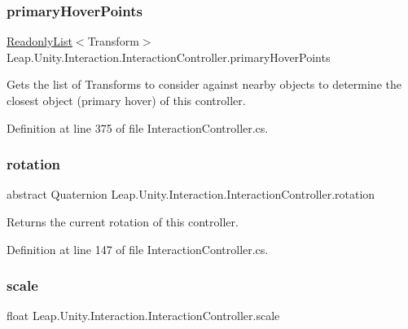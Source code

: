 \subsubsection{\texorpdfstring{primaryHoverPoints}{primaryHoverPoints}}
{\footnotesize\ttfamily \mbox{\hyperlink{struct_leap_1_1_unity_1_1_readonly_list}{Readonly\+List}}$<$Transform$>$ Leap.\+Unity.\+Interaction.\+Interaction\+Controller.\+primary\+Hover\+Points\hspace{0.3cm}{\ttfamily [get]}}



Gets the list of Transforms to consider against nearby objects to determine the closest object (primary hover) of this controller. 



Definition at line 375 of file Interaction\+Controller.\+cs.

\mbox{\label{class_leap_1_1_unity_1_1_interaction_1_1_interaction_controller_a783f8f2327ab0ef060ac319153883dba}} 
\subsubsection{\texorpdfstring{rotation}{rotation}}
{\footnotesize\ttfamily abstract Quaternion Leap.\+Unity.\+Interaction.\+Interaction\+Controller.\+rotation\hspace{0.3cm}{\ttfamily [get]}}



Returns the current rotation of this controller. 



Definition at line 147 of file Interaction\+Controller.\+cs.

\mbox{\label{class_leap_1_1_unity_1_1_interaction_1_1_interaction_controller_ab14c000b2374afa1b711f394ca45fead}} 
\subsubsection{\texorpdfstring{scale}{scale}}
{\footnotesize\ttfamily float Leap.\+Unity.\+Interaction.\+Interaction\+Controller.\+scale\hspace{0.3cm}{\ttfamily [get]}}



